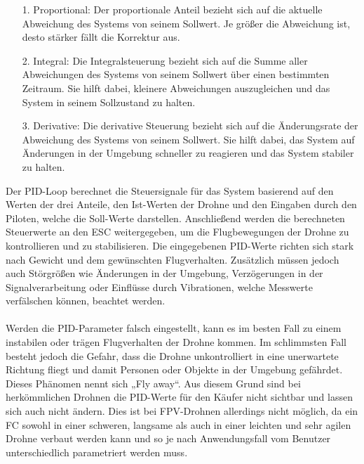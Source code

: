             \begin{itemize}
                \item[1.] Proportional: Der proportionale Anteil bezieht sich auf die aktuelle Abweichung des Systems von seinem Sollwert. Je größer die Abweichung ist, desto stärker fällt die Korrektur aus.
                \item[2.] Integral: Die Integralsteuerung bezieht sich auf die Summe aller Abweichungen des Systems von seinem Sollwert über einen bestimmten Zeitraum. Sie hilft dabei, kleinere Abweichungen auszugleichen und das System in seinem Sollzustand zu halten.
                \item[3.] Derivative: Die derivative Steuerung bezieht sich auf die Änderungsrate der Abweichung des Systems von seinem Sollwert. Sie hilft dabei, das System auf Änderungen in der Umgebung schneller zu reagieren und das System stabiler zu halten.
            \end{itemize}

            Der PID-Loop berechnet die Steuersignale für das System basierend auf den Werten der drei Anteile, den Ist-Werten der Drohne und den Eingaben durch den Piloten, welche die Soll-Werte darstellen. Anschließend werden die berechneten Steuerwerte an den ESC weitergegeben, um die Flugbewegungen der Drohne zu kontrollieren und zu stabilisieren. Die eingegebenen PID-Werte richten sich stark nach Gewicht und dem gewünschten Flugverhalten. Zusätzlich müssen jedoch auch Störgrößen wie Änderungen in der Umgebung, Verzögerungen in der Signalverarbeitung oder Einflüsse durch Vibrationen, welche Messwerte verfälschen können, beachtet werden.
            \\ \\
            Werden die PID-Parameter falsch eingestellt, kann es im besten Fall zu einem instabilen oder trägen Flugverhalten der Drohne kommen. Im schlimmsten Fall besteht jedoch die Gefahr, dass die Drohne unkontrolliert in eine unerwartete Richtung fliegt und damit Personen oder Objekte in der Umgebung gefährdet. Dieses Phänomen nennt sich „Fly away“. Aus diesem Grund sind bei herkömmlichen Drohnen die PID-Werte für den Käufer nicht sichtbar und lassen sich auch nicht ändern. Dies ist bei FPV-Drohnen allerdings nicht möglich, da ein FC sowohl in einer schweren, langsame als auch in einer leichten und sehr agilen Drohne verbaut werden kann und so je nach Anwendungsfall vom Benutzer unterschiedlich parametriert werden muss.


